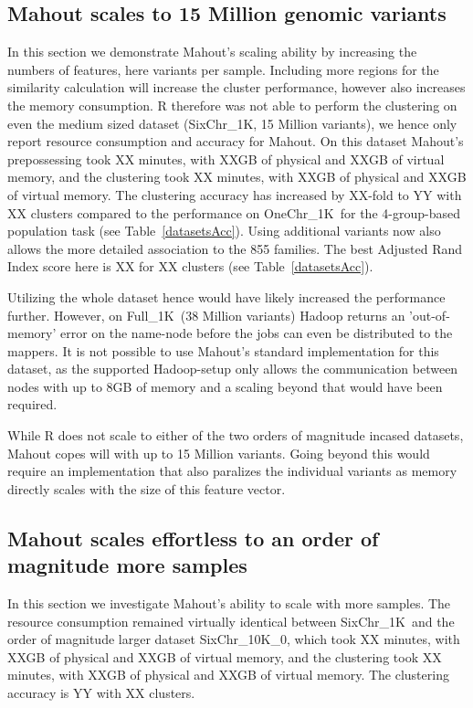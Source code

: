 \documentclass[twocolumn]{bmcart}%
\newcommand{\OneReal}{OneChr\_1K}
\newcommand{\SixReal}{SixChr\_1K}
\newcommand{\FullReal}{Full\_1K}
\newcommand{\SixArtiExact}{SixChr\_10K\_0}
\begin{document}
\subsection*{Mahout scales to 15 Million genomic variants}
In this section we demonstrate Mahout's scaling ability by increasing the numbers of features, here variants per sample. 
Including more regions for the similarity calculation will increase the cluster performance, however also increases the memory consumption. 
R therefore was not able to perform the clustering on even the medium sized dataset (\SixReal , 15 Million variants), we hence only report resource consumption and accuracy for Mahout.
On this dataset Mahout's prepossessing took XX minutes, with XXGB of physical and XXGB of virtual memory, and the clustering took XX minutes, with XXGB of physical and XXGB of virtual memory. 
The clustering accuracy has increased by XX-fold to YY with XX clusters compared to the performance on \OneReal\ for the 4-group-based population task (see Table~\ref{datasetsAcc}).
Using additional variants now also allows the more detailed association to the 855 families.
The best Adjusted Rand Index score here is XX for XX clusters (see Table~\ref{datasetsAcc}).

Utilizing the whole dataset hence would have likely increased the performance further. However, on \FullReal\ (38 Million variants) Hadoop returns an 'out-of-memory' error on the name-node before the jobs can even be distributed to the mappers. 
It is not possible to use Mahout's standard implementation for this dataset, as the supported Hadoop-setup only allows the communication between nodes with up to 8GB of memory and a scaling beyond that would have been required.

While R does not scale to either of the two orders of magnitude incased datasets, Mahout copes will with up to 15 Million variants. Going beyond this would require an implementation that also paralizes the individual variants as memory directly scales with the size of this feature vector.  


\subsection*{Mahout scales effortless to an order of magnitude more samples}
In this section we investigate Mahout's ability to scale with more samples.
The resource consumption remained virtually identical between \SixReal\ and the order of magnitude larger dataset \SixArtiExact, which took XX minutes, with XXGB of physical and XXGB of virtual memory, and the clustering took XX minutes, with XXGB of physical and XXGB of virtual memory. 
The clustering accuracy is YY with XX clusters.
\end{document}
